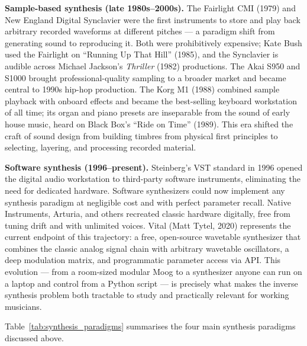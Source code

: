 \par \vspace{0.3cm}

\noindent \textbf{Sample-based synthesis (late 1980s--2000s).} The Fairlight CMI (1979) and New England Digital Synclavier were the first instruments to store and play back arbitrary recorded waveforms at different pitches --- a paradigm shift from generating sound to reproducing it. Both were prohibitively expensive; Kate Bush used the Fairlight on ``Running Up That Hill'' (1985), and the Synclavier is audible across Michael Jackson's \textit{Thriller} (1982) productions. The Akai S950 and S1000 brought professional-quality sampling to a broader market and became central to 1990s hip-hop production. The Korg M1 (1988) combined sample playback with onboard effects and became the best-selling keyboard workstation of all time; its organ and piano presets are inseparable from the sound of early house music, heard on Black Box's ``Ride on Time'' (1989). This era shifted the craft of sound design from building timbres from physical first principles to selecting, layering, and processing recorded material.

\par \vspace{0.3cm}

\noindent \textbf{Software synthesis (1996--present).} Steinberg's VST standard in 1996 opened the digital audio workstation to third-party software instruments, eliminating the need for dedicated hardware. Software synthesizers could now implement any synthesis paradigm at negligible cost and with perfect parameter recall. Native Instruments, Arturia, and others recreated classic hardware digitally, free from tuning drift and with unlimited voices. Vital (Matt Tytel, 2020) represents the current endpoint of this trajectory: a free, open-source wavetable synthesizer that combines the classic analog signal chain with arbitrary wavetable oscillators, a deep modulation matrix, and programmatic parameter access via API. This evolution --- from a room-sized modular Moog to a synthesizer anyone can run on a laptop and control from a Python script --- is precisely what makes the inverse synthesis problem both tractable to study and practically relevant for working musicians.

\par \vspace{0.3cm}

\noindent Table~\ref{tab:synthesis_paradigms} summarises the four main synthesis paradigms discussed above.

